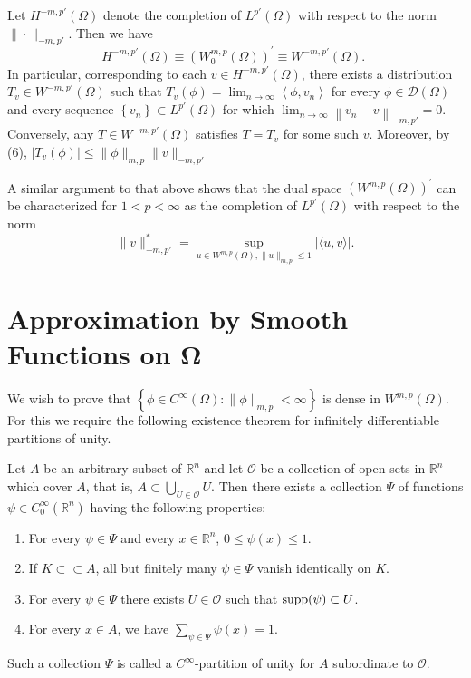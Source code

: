 \begin{para}
  Let $H^{-m, p'}(\Omega)$ denote the completion of $L^{p'}(\Omega)$
  with respect to the norm $\|\cdot\|_{-m, p'}$. Then we have
  \[
  H^{-m, p'}(\Omega) \equiv\left(W_0^{m, p}(\Omega)\right)^{\prime} \equiv W^{-m, p'}(\Omega) \text {. }
  \]
  In particular, corresponding to each $v \in H^{-m, p'}(\Omega)$, there exists a 
  distribution $T_v \in W^{-m, p'}(\Omega)$ such that
  $T_v(\phi)=\lim _{n \rightarrow \infty}\left\langle\phi, v_n\right\rangle$
  for every $\phi \in \mathscr{D}(\Omega)$ and every sequence
  $\left\{v_n\right\} \subset L^{p'}(\Omega)$ for which
  $\lim _{n \rightarrow \infty}\left\|v_n-v\right\|_{-m, p'}=0$.
  Conversely, any $T \in W^{-m, p'}(\Omega)$ satisfies $T=T_v$ for some such $v$.
  Moreover, by (6), $\left|T_v(\phi)\right| \leq\|\phi\|_{m, p}\|v\|_{-m, p'}$
\end{para}

\begin{para}
  A similar argument to that above shows that the dual space $\left(W^{m, p}(\Omega)\right)^{\prime}$ can be characterized for $1<p<\infty$ as the completion of $L^{p'}(\Omega)$ with respect to the norm
  \[
  \|v\|_{-m, p'}^*
    = \sup _{u \in W^{m, p}(\Omega),\|u\|_{m,p} \leq 1}|\langle u, v\rangle|.
  \]
\end{para}


\section[Approximation by Smooth Functions on $\Omega$]%
  {Approximation by Smooth Functions on $\bm{\Omega}$}

We wish to prove that $\left\{\phi \in C^{\infty}(\Omega):\|\phi\|_{m, p}<\infty\right\}$
is dense in $W^{m,p}(\Omega)$. For this we require the following existence theorem for
infinitely differentiable partitions of unity.

\begin{theorem}
  Let $A$ be an arbitrary subset of $\mathbb{R}^n$ and let $\mathscr{O}$ be a collection of open 
  sets in $\mathbb{R}^n$ which cover $A$, that is, $A \subset \bigcup_{U \in \mathscr{O}} U$.
  Then there exists a collection $\Psi$ of functions $\psi \in C_0^{\infty}\left(\mathbb{R}^n\right)$ having the following properties:
  \begin{enumerate}[label = (\roman*)]
    \item For every $\psi \in \Psi$ and every $x \in \mathbb{R}^n$, $0 \leq \psi(x) \leq 1$.
    \item If $K \subset\subset A$, all but finitely many $\psi \in \Psi$ vanish identically on $K$.
    \item For every $\psi \in \Psi$ there exists $U \in \mathscr{O}$ such that $\operatorname{supp}(\psi) \subset U$.
    \item For every $x \in A$, we have $\sum_{\psi \in \Psi} \psi(x)=1$.
  \end{enumerate}
  Such a collection $\Psi$ is called a $C^{\infty}$-partition of unity for $A$ subordinate to $\mathscr{O}$.
\end{theorem}

